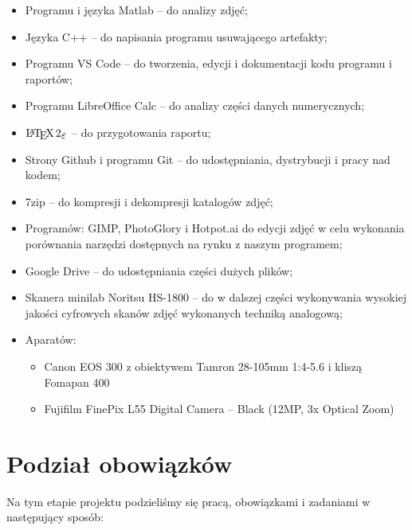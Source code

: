 \documentclass[]{mwart}
\begin{document}
\begin{itemize}
    \item Programu i języka Matlab -- do analizy zdjęć;
    \item Języka C++ -- do napisania programu usuwającego artefakty;
    \item Programu VS Code -- do tworzenia, edycji i dokumentacji kodu programu i raportów;
    \item Programu LibreOffice Calc -- do analizy części danych numerycznych;
    \item $\LaTeXe{}$ -- do przygotowania raportu;
    \item Strony Github i programu Git -- do udostępniania, dystrybucji i pracy nad kodem;
    \item 7zip -- do kompresji i dekompresji katalogów zdjęć;
    \item Programów: GIMP, PhotoGlory i Hotpot.ai do edycji zdjęć w celu wykonania porównania narzędzi dostępnych na rynku z naszym programem;
    \item Google Drive -- do udostępniania części dużych plików;
    \item Skanera minilab Noritsu HS-1800 -- do w dalszej części wykonywania wysokiej jakości cyfrowych skanów zdjęć wykonanych techniką analogową;
    \item Aparatów:
          \begin{itemize}
              \item Canon EOS 300 z obiektywem Tamron 28-105mm 1:4-5.6 i kliszą Fomapan 400
              \item Fujifilm FinePix L55 Digital Camera -- Black (12MP, 3x Optical Zoom)
          \end{itemize}
\end{itemize}


\section{Podział obowiązków}
Na tym etapie projektu podzieliśmy się pracą, obowiązkami i zadaniami w następujący sposób:
\end{document}
